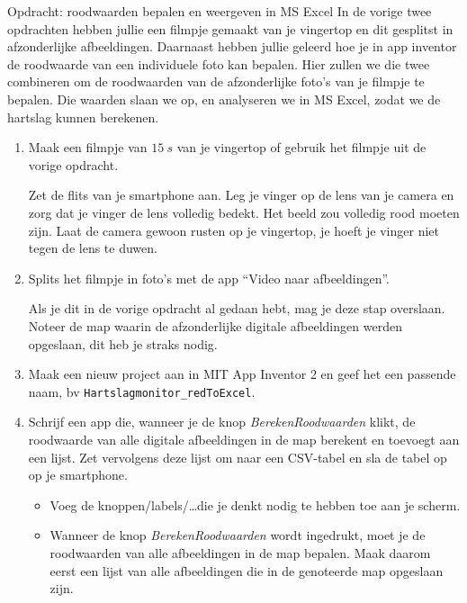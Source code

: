 \begin{opdracht}{Opdracht: roodwaarden bepalen en weergeven in MS Excel}
	In de vorige twee opdrachten hebben jullie een filmpje gemaakt van je vingertop en dit gesplitst in afzonderlijke afbeeldingen. Daarnaast hebben jullie geleerd hoe je in app inventor de roodwaarde van een individuele foto kan bepalen. Hier zullen we die twee combineren om de roodwaarden van de afzonderlijke foto's van je filmpje te bepalen. Die waarden slaan we op, en analyseren we in MS Excel, zodat we de hartslag kunnen berekenen.
	
\begin{enumerate}
	
	\item Maak een filmpje van $15~s$ van je vingertop of gebruik het filmpje uit de vorige opdracht.
	
	Zet de flits van je smartphone aan. Leg je vinger op de lens van je camera en zorg dat je vinger de lens volledig bedekt. Het beeld zou volledig rood moeten zijn. Laat de camera gewoon rusten op je vingertop, je hoeft je vinger niet tegen de lens te duwen.
	
	\item Splits het filmpje in foto's met de app \textquotedblleft Video naar afbeeldingen\textquotedblright.
	
	Als je dit in de vorige opdracht al gedaan hebt, mag je deze stap overslaan. Noteer de map waarin de afzonderlijke digitale afbeeldingen werden opgeslaan, dit heb je straks nodig.
	
	\item Maak een nieuw project aan in MIT App Inventor 2 en geef het een passende naam, bv \texttt{Hartslagmonitor\_redToExcel}. 
	
	\item Schrijf een app die, wanneer je de knop \emph{BerekenRoodwaarden} klikt, de roodwaarde van alle digitale afbeeldingen in de map berekent en toevoegt aan een lijst. Zet vervolgens deze lijst om naar een CSV-tabel en sla de tabel op op je smartphone.

	
		\begin{itemize}
			\item Voeg de knoppen/labels/\ldots die je denkt nodig te hebben toe aan je scherm.
			\item Wanneer de knop \emph{BerekenRoodwaarden} wordt ingedrukt, moet je de roodwaarden van alle afbeeldingen in de map bepalen. Maak daarom eerst een lijst van alle afbeeldingen die in de genoteerde map opgeslaan zijn. 
			

\end{itemize}
\end{enumerate}
\end{opdracht}
